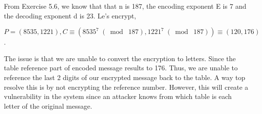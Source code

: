 \documentclass{article}
\begin{document}
From Exercise 5.6, we know that that n is 187, the encoding exponent E is 7 and the decoding exponent d is 23. Le's encrypt,
\begin{center}
    $P = (8535, 1221), C \equiv (8535^7 \;(\bmod\; 187), 1221^7 \;(\bmod\; 187)) \equiv (120, 176)$.
\end{center}
The issue is that we are unable to convert the encryption to letters. Since the table reference part of encoded message results to 176. Thus, we are unable to reference the last 2 digits of our encrypted message back to the table. A way top resolve this is by not encrypting the reference number. However, this will create a vulnerability in the system since an attacker knows from which table is each letter of the original message. 
\end{document}
